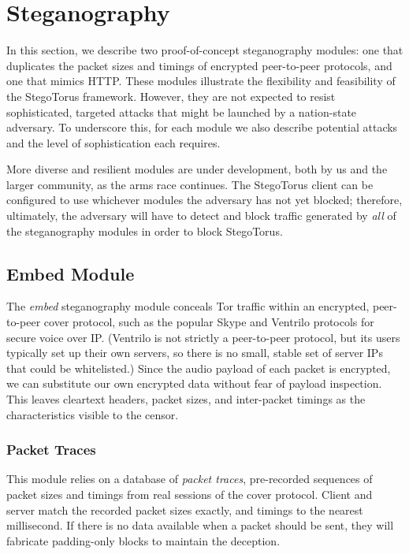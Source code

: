 \section{Steganography}\label{s:steg}

In this section, we describe two proof-of-concept steganography
modules: one that duplicates the packet sizes and timings of encrypted
peer-to-peer protocols, and one that mimics HTTP.  These modules
illustrate the flexibility and feasibility of the StegoTorus
framework.  However, they are not expected to resist sophisticated,
targeted attacks that might be launched by a nation-state adversary.
To underscore this, for each module we also describe potential attacks
and the level of sophistication each requires.

More diverse and resilient modules are under development, both by us
and the larger community, as the arms race continues.  The StegoTorus
client can be configured to use whichever modules the adversary has
not yet blocked; therefore, ultimately, the adversary will have to
detect and block traffic generated by \emph{all} of the steganography
modules in order to block StegoTorus.

\subsection{Embed Module}

The \emph{embed} steganography module conceals Tor traffic within an
encrypted, peer-to-peer cover protocol, such as the popular Skype and
Ventrilo protocols for secure voice over IP.  (Ventrilo is not
strictly a peer-to-peer protocol, but its users typically set up their
own servers, so there is no small, stable set of server IPs that could
be whitelisted.)  Since the audio payload of each packet is encrypted,
we can substitute our own encrypted data without fear of payload
inspection.  This leaves cleartext headers, packet sizes, and
inter-packet timings as the characteristics visible to the censor.

\subsubsection{Packet Traces}

This module relies on a database of \emph{packet traces}, pre-recorded
sequences of packet sizes and timings from real sessions of the cover
protocol.  Client and server match the recorded packet sizes exactly,
and timings to the nearest millisecond.  If there is no data available
when a packet should be sent, they will fabricate padding-only blocks
to maintain the deception.

